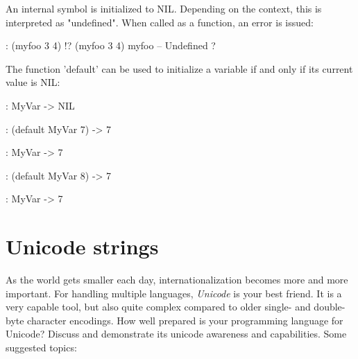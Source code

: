 \begin{wideverbatim}

An internal symbol is initialized to NIL. Depending on the context,
this is interpreted as "undefined". When called as a function, an
error is issued:

: (myfoo 3 4)
!? (myfoo 3 4)
myfoo -- Undefined
?

The function 'default' can be used to initialize a variable if and
only if its current value is NIL:

: MyVar
-> NIL

: (default MyVar 7)
-> 7

: MyVar
-> 7

: (default MyVar 8)
-> 7

: MyVar
-> 7

\end{wideverbatim}








\pagebreak{}
\section*{Unicode strings}

As the world gets smaller each day, internationalization becomes more
and more important. For handling multiple languages,
\emph{Unicode} is your best friend. It is a very capable
tool, but also quite complex compared to older single- and double-byte
character encodings. How well prepared is your programming language for
Unicode? Discuss and demonstrate its unicode awareness and capabilities.
Some suggested topics:

